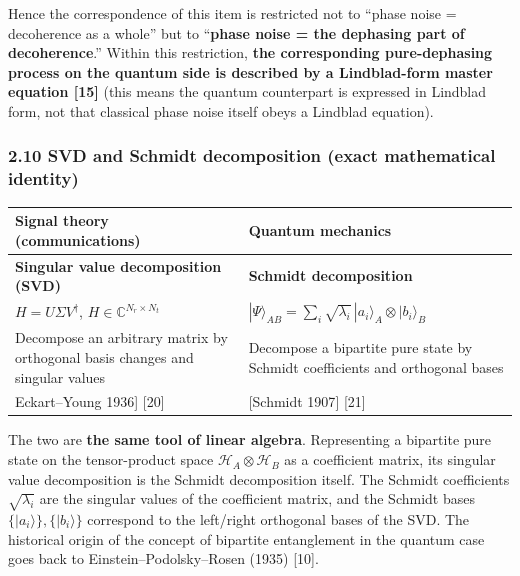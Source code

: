 \documentclass[
]{article}
\newcounter{none} %
\begin{document}
Hence the correspondence of this item is restricted not to ``phase noise
= decoherence as a whole'' but to ``\textbf{phase noise = the dephasing
part of decoherence}.'' Within this restriction, \textbf{the
corresponding pure-dephasing process on the quantum side is described by
a Lindblad-form master equation {[}15{]}} (this means the quantum
counterpart is expressed in Lindblad form, not that classical phase
noise itself obeys a Lindblad equation).

\subsubsection{2.10 SVD and Schmidt decomposition (exact mathematical
identity)}\label{svd-and-schmidt-decomposition-exact-mathematical-identity}

{\def\LTcaptype{none} %
\begin{longtable}[]{@{}
  >{\raggedright\arraybackslash}p{}
  >{\raggedright\arraybackslash}p{}@{}}
\toprule\noalign{}
\begin{minipage}[b]{\linewidth}\raggedright
Signal theory (communications)
\end{minipage} & \begin{minipage}[b]{\linewidth}\raggedright
Quantum mechanics
\end{minipage} \\
\midrule\noalign{}
\endhead
\bottomrule\noalign{}
\endlastfoot
\textbf{Singular value decomposition (SVD)} & \textbf{Schmidt
decomposition} \\
\(H = U \Sigma V^\dagger\), \(H \in \mathbb{C}^{N_r \times N_t}\) &
\(|\Psi\rangle_{AB} = \sum_i \sqrt{\lambda_i} \, |a_i\rangle_A \otimes |b_i\rangle_B\) \\
Decompose an arbitrary matrix by orthogonal basis changes and singular
values & Decompose a bipartite pure state by Schmidt coefficients and
orthogonal bases \\
{[}Eckart--Young 1936{]} {[}20{]} & {[}Schmidt 1907{]} {[}21{]} \\
\end{longtable}
}

The two are \textbf{the same tool of linear algebra}. Representing a
bipartite pure state on the tensor-product space
\(\mathcal{H}_A\otimes\mathcal{H}_B\) as a coefficient matrix, its
singular value decomposition is the Schmidt decomposition itself. The
Schmidt coefficients \(\sqrt{\lambda_i}\) are the singular values of the
coefficient matrix, and the Schmidt bases
\(\{|a_i\rangle\},\{|b_i\rangle\}\) correspond to the left/right
orthogonal bases of the SVD. The historical origin of the concept of
bipartite entanglement in the quantum case goes back to
Einstein--Podolsky--Rosen (1935) {[}10{]}.
\end{document}
